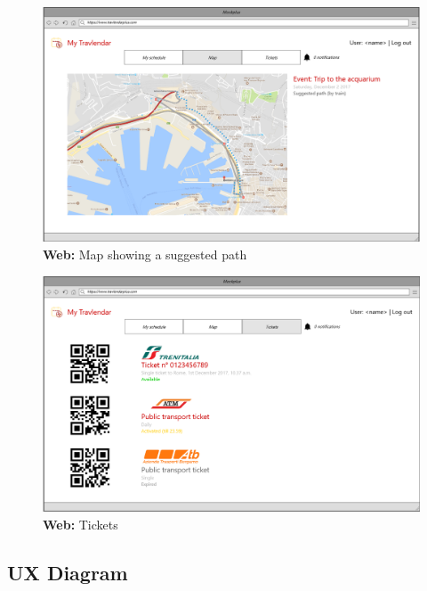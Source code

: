\documentclass{article}
\begin{document}
			\begin{figure}[H]
			\includegraphics[width=\linewidth]{Images/Mockup/Web/09-web_Map.png}
			\caption{\textbf{Web:} Map showing a suggested path}
			\label{fig:MU9}
			\end{figure}
			\begin{figure}[H]
			\includegraphics[width=\linewidth]{Images/Mockup/Web/10-web_Tickets.png}
			\caption{\textbf{Web:} Tickets}
			\label{fig:MU10}
			\end{figure}
		\subsection{UX Diagram}
\end{document}
